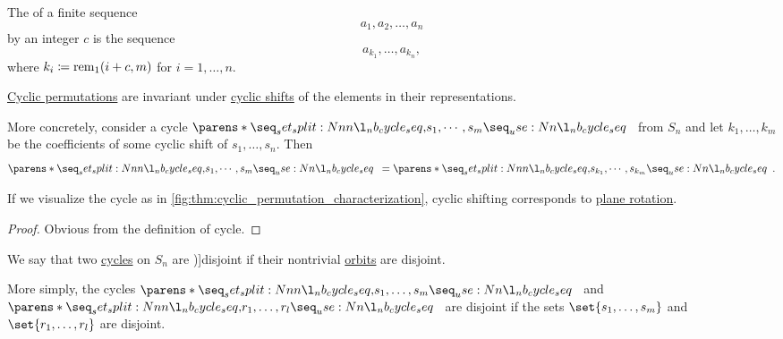 \begin{definition}\label{def:cyclic_shift}\mimprovised
  The  of a finite sequence
  \begin{equation*}
    a_1, a_2, \ldots, a_n
  \end{equation*}
  by an integer \( c \) is the sequence
  \begin{equation*}
    a_{k_1}, \ldots, a_{k_n},
  \end{equation*}
  where \( k_i \coloneqq \operatorname{rem}_1(i + c, m) \) for \( i = 1, \ldots, n \).
\end{definition}

\begin{proposition}\label{thm:cyclic_permutation_cyclic_shift}
  \hyperref[def:cyclic_permutation]{Cyclic permutations} are invariant under \hyperref[def:cyclic_shift]{cyclic shifts} of the elements in their representations.

  More concretely, consider a cycle \( \cycle{ s_1, \cdots, s_m } \) from \( S_n \) and let \( k_1, \ldots, k_m \) be the coefficients of some cyclic shift of \( s_1, \ldots, s_n \). Then
  \begin{equation*}
    \cycle{ s_1, \cdots, s_m } = \cycle{ s_{k_1}, \cdots, s_{k_m} }.
  \end{equation*}
\end{proposition}
\begin{comments}
  \item If we visualize the cycle as in \cref{fig:thm:cyclic_permutation_characterization}, cyclic shifting corresponds to \hyperref[def:rigid_motion/rotation]{plane rotation}.
\end{comments}
\begin{proof}
  Obvious from the definition of cycle.
\end{proof}

\begin{definition}\label{def:disjoint_cycle}
  We say that two \hyperref[def:cyclic_permutation]{cycles} on \( S_n \) are \term[ru=независимые (\cite[sec. 4.3]{Тыртышников2007ЛинАлгебра})]{disjoint} if their nontrivial \hyperref[def:group_action_orbit]{orbits} are disjoint.
\end{definition}
\begin{comments}
  \item More simply, the cycles \( \cycle{ s_1, \ldots, s_m } \) and \( \cycle{ r_1, \ldots, r_l } \) are disjoint if the sets \( \set{ s_1, \ldots, s_m } \) and \( \set{ r_1, \ldots, r_l } \) are disjoint.
\end{comments}


